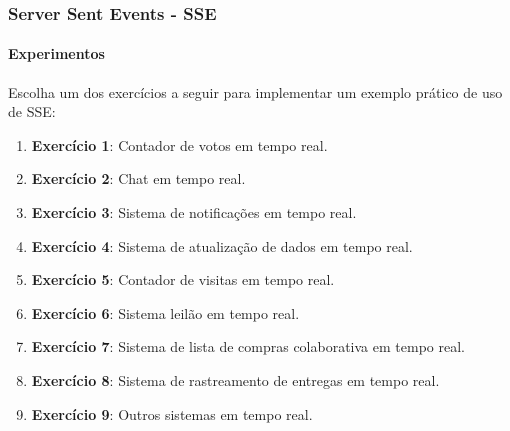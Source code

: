 \documentclass[
	9pt, %
	t, %
]{beamer}
\begin{document}
\begin{frame}
	\frametitle{Server Sent Events - SSE}
	\framesubtitle{Experimentos}

	Escolha um dos exercícios a seguir para implementar um exemplo prático de uso de SSE:
	\bigskip

	\begin{enumerate}
		\item \textbf{Exercício 1}: Contador de votos em tempo real.
		\item \textbf{Exercício 2}: Chat em tempo real.
		\item \textbf{Exercício 3}: Sistema de notificações em tempo real.
		\item \textbf{Exercício 4}: Sistema de atualização de dados em tempo real.
		\item \textbf{Exercício 5}: Contador de visitas em tempo real.
		\item \textbf{Exercício 6}: Sistema leilão em tempo real.
		\item \textbf{Exercício 7}: Sistema de lista de compras colaborativa em tempo real.
		\item \textbf{Exercício 8}: Sistema de rastreamento de entregas em tempo real.
		\item \textbf{Exercício 9}: Outros sistemas em tempo real.
	\end{enumerate}

\end{frame}
\end{document}
